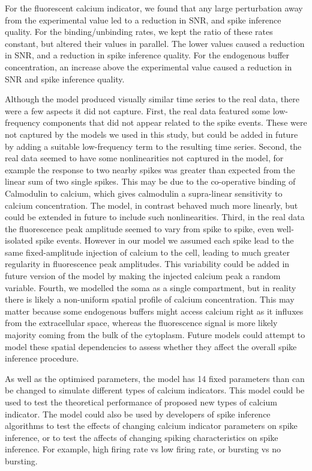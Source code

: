 \documentclass[a4paper,12pt]{article}
\theoremstyle{definition}
\begin{document}
For the fluorescent calcium indicator, we found that any large perturbation away from the experimental value led to a reduction in SNR, and spike inference quality. For the binding/unbinding rates, we kept the ratio of these rates constant, but altered their values in parallel. The lower values caused a reduction in SNR, and a reduction in spike inference quality. For the endogenous buffer concentration, an increase above the experimental value caused a reduction in SNR and spike inference quality.

Although the model produced visually similar time series to the real data, there were a few aspects it did not capture. First, the real data featured some low-frequency components that did not appear related to the spike events. These were not captured by the models we used in this study, but could be added in future by adding a suitable low-frequency term to the resulting time series. Second, the real data seemed to have some nonlinearities not captured in the model, for example the response to two nearby spikes was greater than expected from the linear sum of two single spikes. This may be due to the co-operative binding of Calmodulin to calcium, which gives calmodulin a supra-linear sensitivity to calcium concentration. The model, in contrast behaved much more linearly, but could be extended in future to include such nonlinearities. Third, in the real data the fluorescence peak amplitude seemed to vary from spike to spike, even well-isolated spike events. However in our model we assumed each spike lead to the same fixed-amplitude injection of calcium to the cell, leading to much greater regularity in fluorescence peak amplitudes. This variability could be added in future version of the model by making the injected calcium peak a random variable. Fourth, we modelled the soma as a single compartment, but in reality there is likely a non-uniform spatial profile of calcium concentration. This may matter because some endogenous buffers might access calcium right as it influxes from the extracellular space, whereas the fluorescence signal is more likely majority coming from the bulk of the cytoplasm. Future models could attempt to model these spatial dependencies to assess whether they affect the overall spike inference procedure.

As well as the optimised parameters, the model has 14 fixed parameters than can be changed to simulate different types of calcium indicators. This model could be used to test the theoretical performance of proposed new types of calcium indicator.
The model could also be used by developers of spike inference algorithms to test the effects of changing calcium indicator parameters on spike inference, or to test the affects of changing spiking characteristics on spike inference. For example, high firing rate vs low firing rate, or bursting vs no bursting.
\end{document}
